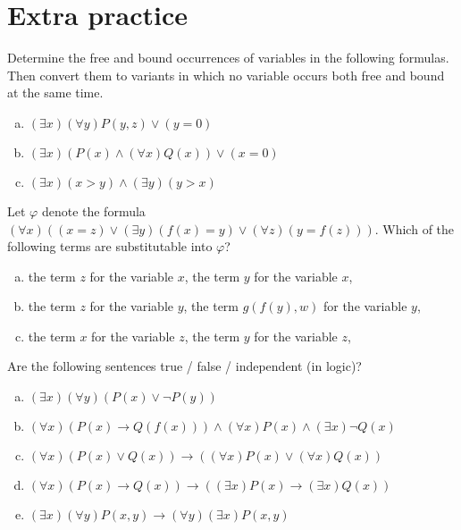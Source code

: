         
        
\section*{Extra practice}


\begin{problem}

    Determine the free and bound occurrences of variables in the following formulas. Then convert them to variants in which no variable occurs both free and bound at the same time.
    \begin{enumerate}[(a)]
        \item $(\exists x)(\forall y)P(y,z) \vee (y=0)$
        \item $(\exists x)(P(x) \wedge (\forall x)Q(x)) \vee (x=0)$
        \item $(\exists x)(x>y) \wedge (\exists y)(y>x)$
    \end{enumerate}

\end{problem}


\begin{problem}
    
    Let $\varphi$ denote the formula $(\forall x)((x=z) \vee (\exists y)(f(x)=y) \vee (\forall z)(y=f(z)))$. Which of the following terms are substitutable into $\varphi$?
    \begin{enumerate}[(a)]
        \item the term $z$ for the variable $x$, the term $y$ for the variable $x$,
        \item the term $z$ for the variable $y$, the term $g(f(y),w)$ for the variable $y$,
        \item the term $x$ for the variable $z$, the term $y$ for the variable $z$,
    \end{enumerate}

\end{problem}


\begin{problem}

    Are the following sentences true / false / independent (in logic)?

    \begin{enumerate}[(a)]
        \item $(\exists x)(\forall y)(P(x) \vee \neg P(y))$
        \item $(\forall x)(P(x)\to Q(f(x))) \wedge (\forall x)P(x) \wedge (\exists x)\neg Q(x)$
        \item $(\forall x)(P(x) \vee Q(x)) \to ((\forall x)P(x) \vee (\forall x)Q(x))$
        \item $(\forall x)(P(x)\to Q(x)) \to ((\exists x)P(x)\to(\exists x)Q(x))$
        \item $(\exists x)(\forall y)P(x,y) \to (\forall y)(\exists x)P(x,y)$
    \end{enumerate}

\end{problem}


